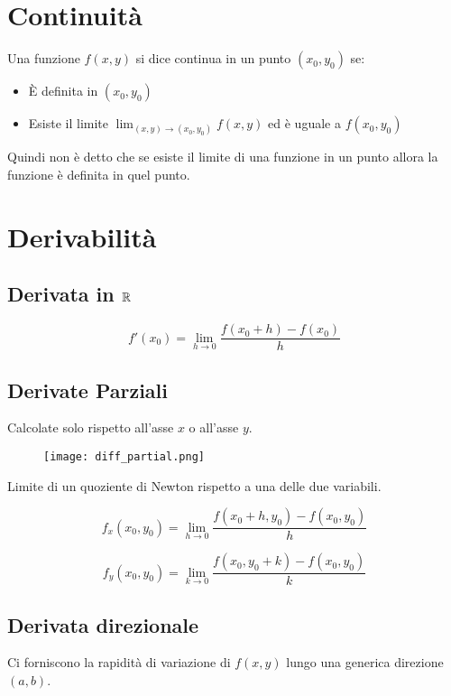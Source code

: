 \section{Continuità}

Una funzione $f(x,y)$ si dice continua in un punto $(x_0,y_0)$ se:

\begin{itemize}
\item È definita in $(x_0,y_0)$
\item Esiste il limite $\lim_{(x,y)\to(x_0,y_0)} f(x,y)$ ed è uguale a $f(x_0,y_0)$
\end{itemize}

Quindi non è detto che se esiste il limite di una funzione in un punto allora la funzione è definita in quel punto.

\section{Derivabilità}

\subsection{Derivata in $\mathbb{R}$}

$$f'(x_0)=\lim_{h\to 0}\frac{f(x_0+h)-f(x_0)}{h}$$

\subsection{Derivate Parziali}

Calcolate solo rispetto all'asse $x$ o all'asse $y$.

\begin{figure}[H]
\texttt{[image: diff\_partial.png]}
\end{figure}

Limite di un quoziente di Newton rispetto a una delle due variabili.

$$
f_x(x_0,y_0) = \lim_{h\to 0} \frac{f(x_0+h,y_0)-f(x_0,y_0)}{h}
$$

$$
f_y(x_0,y_0) = \lim_{k\to 0} \frac{f(x_0,y_0+k)-f(x_0,y_0)}{k}
$$

\subsection{Derivata direzionale}

Ci forniscono la rapidità di variazione di $f(x,y)$ lungo una generica direzione $(a,b)$.

